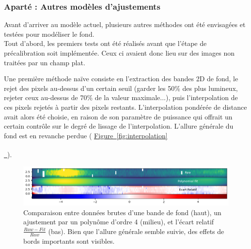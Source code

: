 \documentclass[12pt, a4paper]{article}
\newcommand*{\figref}[2][]{%
  \hyperref[{#2}]{%
    Figure~\ref*{#2}%
    \ifx\\#1\\%
    \else
      \,#1%
    \fi
  }%
}
\begin{document}
\subsubsection{Aparté : Autres modèles d'ajustements}

Avant d'arriver au modèle actuel, plusieurs autres méthodes ont été envisagées et testées pour modéliser le fond.\\

Tout d'abord, les premiers tests ont été réalisés avant que l'étape de précalibration soit implémentée. Ceux ci avaient donc lieu sur des images non traitées par un champ plat.

Une première méthode naïve consiste en l'extraction des bandes 2D de fond, le rejet des pixels au-dessus d'un certain seuil (garder les 50\% des plus lumineux, rejeter ceux au-dessus de 70\% de la valeur maximale...), puis l'interpolation de ces pixels rejetés à partir des pixels restants. L'interpolation pondérée de distance avait alors été choisie, en raison de son paramètre de puissance qui offrait un certain contrôle sur le degré de lissage de l'interpolation. L'allure générale du fond est en revanche perdue (\figref{fig:interpolation}).\\

\begin{figure}[H]
  \centering
  \includegraphics[scale=0.72]{assets/2D_polynomial.png}
  \caption{Comparaison entre données brutes d'une bande de fond (haut), un ajustement par un polynôme d'ordre 4 (milieu), et l'écart relatif $\frac{Raw - Fit}{Raw}$ (bas). Bien que l'allure générale semble suivie, des effets de bords importants sont visibles.}
  \label{fig:2D_polynomial}
\end{figure}
\end{document}
